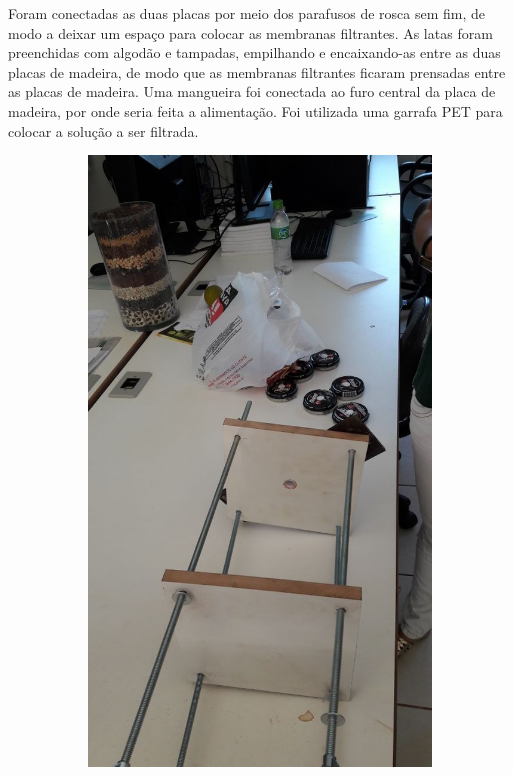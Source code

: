 Foram conectadas as duas placas por meio dos parafusos de rosca sem fim, de modo
a deixar um espaço para colocar as membranas filtrantes. As latas foram
preenchidas com algodão e tampadas, empilhando e encaixando-as entre as duas
placas de madeira, de modo que as membranas filtrantes ficaram prensadas entre
as placas de madeira. Uma mangueira foi conectada ao furo central da placa de
madeira, por onde seria feita a alimentação. Foi utilizada uma garrafa PET para
colocar a solução a ser filtrada.

\begin{figure}
  \begin{subfigure}[H]{0.4\textwidth}
    \includegraphics[width=\textwidth]{figuras/montagem1.png}

\end{subfigure}
\end{figure}
